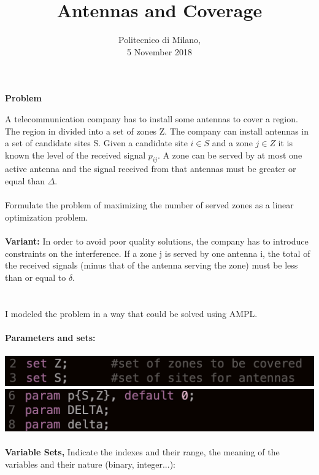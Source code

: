 \documentclass[1pt]{article}
\title{\huge \textrm{Antennas and Coverage}}
\date{\textrm{Politecnico di Milano, \\5 November 2018}}
\begin{document}
	\begin{titlepage}
		\maketitle
	\end{titlepage}


	\newpage

\centerline{\textbf{Problem}}
A telecommunication company has to install some antennas to cover a region. The region in divided into a set of zones Z. The company can install antennas in a set of candidate sites S. Given a candidate site $i \in S$ and a zone $j \in Z$ it is known the level of the received signal $p_{ij}$. A zone can be served by at most one active antenna and the signal received from that antennas must be greater or equal than $\Delta$.
\\\\
Formulate the problem of maximizing the number of served zones as a linear optimization problem.
\\\\
\textbf{Variant:} In order to avoid poor quality solutions, the company has to introduce constraints on the interference. If a zone j is served by one antenna i, the total of the received signals (minus that of the antenna serving the zone) must be less than or equal to $\delta$.\\\\\\
I modeled the problem in a way that could be solved using AMPL.\\\\
\textbf{Parameters and sets:}\\\\
\includegraphics[scale=0.25]{images/sets}\\
\includegraphics[scale=0.25]{images/params}
\\\\
\textbf{Variable Sets,} Indicate the indexes and their range, the meaning of the variables and their nature (binary, integer...):\\\\
\end{document}
